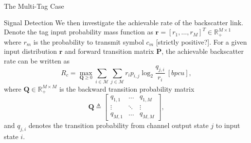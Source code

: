 \documentclass[journal]{IEEEtran}
\begin{document}
\begin{section}{The Multi-Tag Case}
\begin{subsection}{Signal Detection}
			We then investigate the achievable rate of the backscatter link. Denote the tag input probability mass function as $\boldsymbol{r} = [r_1,\ldots,r_M]^T \in \mathbb{R}_+^{M \times 1}$ where $r_m$ is the probability to transmit symbol $c_m$ [strictly positive?]. For a given input distribution $\boldsymbol{r}$ and forward transition matrix $\boldsymbol{P}$, the achievable backscatter rate can be written as
			\begin{equation}
				R_c = \max_{\boldsymbol{Q} \ge 0} \sum_{i \in \mathcal{M}} \sum_{j \in \mathcal{M}} r_i p_{i, j} \log_2 \frac{q_{j, i}}{r_i} \ [\si{bpcu}],
				\label{eq:secondary_rate}
			\end{equation}
			where $\boldsymbol{Q} \in \mathbb{R}_{+}^{M \times M}$ is the backward transition probability matrix
			\begin{equation}
				\boldsymbol{Q} \triangleq
				\begin{bmatrix}
					q_{1, 1} & \ldots & q_{1, M} \\
					\vdots & \ddots & \vdots \\
					q_{M, 1} & \ldots & q_{M, M}
				\end{bmatrix},
			\end{equation}
			and $q_{j, i}$ denotes the transition probability from channel output state $j$ to input state $i$.
		\end{subsection}
	\end{section}
\end{document}
